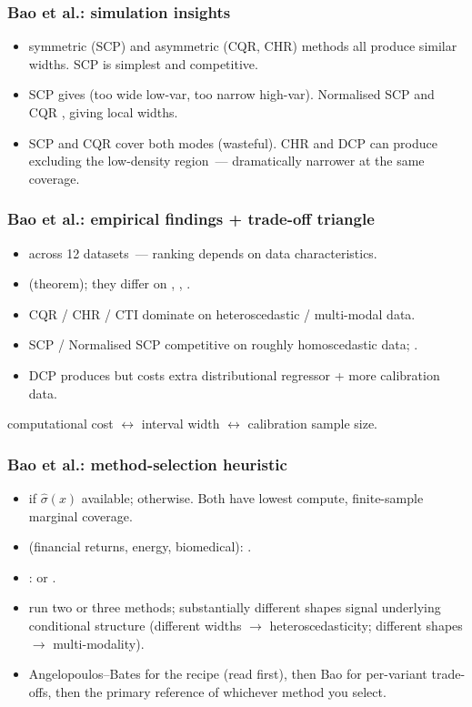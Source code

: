 \documentclass[11pt, aspectratio=169, xcolor={dvipsnames}, usepdftitle=false]{beamer}
\begin{document}
\begin{frame}
\frametitle{Bao et al.: simulation insights}
\begin{itemize}
\item {} symmetric (SCP) and asymmetric (CQR, CHR) methods all produce similar widths. SCP is simplest and competitive.
\item {} SCP gives  (too wide low-var, too narrow high-var). Normalised SCP and CQR , giving local widths.
\item {} SCP and CQR cover both modes  (wasteful). CHR and DCP can produce  excluding the low-density region~--- dramatically narrower at the same coverage.
\end{itemize}
\end{frame}

\begin{frame}
\frametitle{Bao et al.: empirical findings + trade-off triangle}
\begin{itemize}
\item {} across 12 datasets~--- ranking depends on data characteristics.
\item {} (theorem); they differ on , , .
\item CQR / CHR / CTI dominate on heteroscedastic / multi-modal data.
\item SCP / Normalised SCP competitive on roughly homoscedastic data; .
\item DCP produces  but costs extra distributional regressor + more calibration data.
\end{itemize}
 computational cost $\leftrightarrow$ interval width $\leftrightarrow$ calibration sample size.
\end{frame}

\begin{frame}
\frametitle{Bao et al.: method-selection heuristic}
\begin{itemize}
\item {}  if $\hat{\sigma}(x)$ available;  otherwise. Both have lowest compute, finite-sample marginal coverage.
\item {} (financial returns, energy, biomedical): .
\item {}:  or .
\item {} run two or three methods; substantially different shapes signal underlying conditional structure (different widths $\to$ heteroscedasticity; different shapes $\to$ multi-modality).
\item {} Angelopoulos--Bates for the recipe (read first), then Bao for per-variant trade-offs, then the primary reference of whichever method you select.
\end{itemize}
\end{frame}
\end{document}

